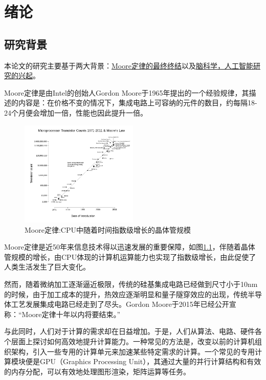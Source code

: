 \chapter{绪论}\label{chapter_introduction}
\graphicspath{{chapter1/figure/}}
%

\section{研究背景}

本论文的研究主要基于两大背景：\uline{Moore定律的最终终结}以及\uline{脑科学，人工智能研究的兴起}。

Moore定律是由Intel的创始人Gordon Moore于1965年提出的一个经验规律，其描述的内容是：在价格不变的情况下，集成电路上可容纳的元件的数目，约每隔18-24个月便会增加一倍，性能也因此提升一倍。\cite{wikipedia_moores_law}

\begin{figure}[htbp]
   \centering
   \includegraphics[width=0.5\textwidth]{MooreLaw.png} %
   \caption{Moore定律:CPU中随着时间指数级增长的晶体管规模}
   \label{fig:moore}
\end{figure}

Moore定律是近50年来信息技术得以迅速发展的重要保障，如图\ref{fig:moore}，伴随着晶体管规模的增长，由CPU体现的计算机运算能力也实现了指数级增长，由此促使了人类生活发生了巨大变化。

然而，随着微纳加工逐渐逼近极限，传统的硅基集成电路已经做到尺寸小于10nm的时候，由于加工成本的提升，热效应逐渐明显和量子隧穿效应的出现，传统半导体工艺发展集成电路已经走到了尽头。Gordon Moore于2015年已经公开宣称：“Moore定律十年以内将要结束。”\cite{moore2015declare}

与此同时，人们对于计算的需求却在日益增加。于是，人们从算法、电路、硬件各个层面上探讨如何高效地提升计算能力。一种常见的方法是，改变以前的计算机组织架构，引入一些专用的计算单元来加速某些特定需求的计算。一个常见的专用计算模块便是GPU（Graphics Processing Unit），其通过大量的并行计算结构和有效的内存分配，可以有效地处理图形渲染，矩阵运算等任务。\cite{wikipedia_gpu}

